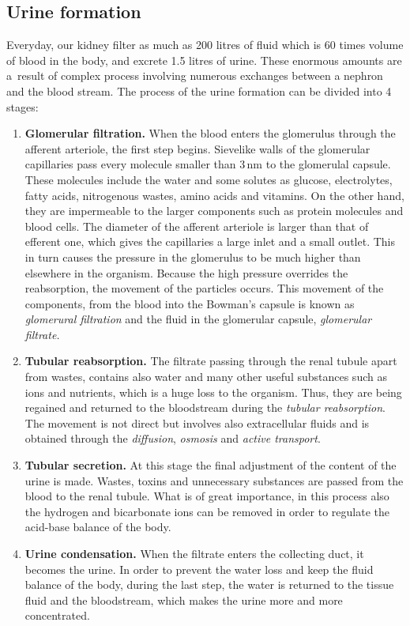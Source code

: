 \subsection{Urine formation} 
Everyday, our kidney filter as much as 200 litres of fluid which is 60 times volume of blood in the body, and excrete 1.5 litres of urine. These enormous amounts are a~result of complex process involving numerous exchanges between a nephron and the blood stream. The process of the urine formation can be divided into 4 stages:
\begin{enumerate}
\item{\textbf{Glomerular filtration.}} When the blood enters the glomerulus through the afferent arteriole, the first step begins. Sievelike walls of the glomerular capillaries  pass every molecule smaller than 3\,nm to the glomerulal capsule. These molecules include the water and some solutes as glucose, electrolytes, fatty acids, nitrogenous wastes, amino acids and vitamins. On the other hand, they are impermeable to the larger components such as protein molecules and blood cells.  The diameter of the afferent arteriole is larger than that of efferent one, which gives the capillaries a large inlet and a small outlet. This in turn causes the pressure in the glomerulus to be much higher than elsewhere in the organism. Because the high pressure overrides the reabsorption, the movement of the particles occurs. This movement  of  the components, from  the  blood  into  the Bowman's capsule is known as \textit{glomerural filtration} and the fluid in the glomerular capsule, \textit{glomerular filtrate.} 

  
\item{\textbf{Tubular reabsorption.}} The filtrate passing through the renal tubule apart from wastes, contains  also water and many other useful substances such as ions and nutrients, which is a huge loss to the organism. Thus, they are being regained and returned to the bloodstream during the \textit{tubular reabsorption}. The movement is not direct but involves also extracellular fluids and is obtained through the \textit{diffusion}, \textit{osmosis} and \textit{active transport}. 
 
\item{\textbf{Tubular secretion.}} At this stage the final adjustment of the content of the urine is made. Wastes, toxins and unnecessary substances are passed from the blood to the renal tubule. What is of great importance, in this process also the hydrogen and bicarbonate ions can be removed in order to regulate the acid-base balance of the body.

\item{\textbf{Urine condensation.}} When the filtrate enters the collecting duct, it becomes the urine. In order to prevent the water loss and keep the fluid balance of the body, during the last step, the water is returned to the tissue fluid and the bloodstream, which makes the urine more and more concentrated.

\end{enumerate}
